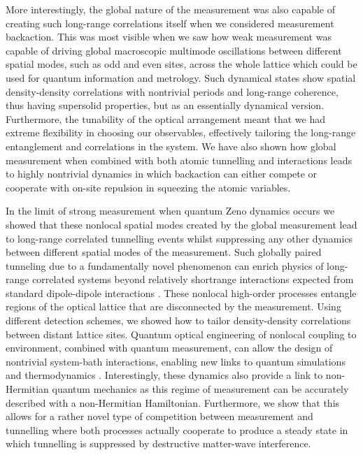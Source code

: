More interestingly, the global nature of the measurement was also
capable of creating such long-range correlations itself when we
considered measurement backaction. This was most visible when we saw
how weak measurement was capable of driving global macroscopic
multimode oscillations between different spatial modes, such as odd
and even sites, across the whole lattice which could be used for
quantum information and metrology. Such dynamical states show spatial
density-density correlations with nontrivial periods and long-range
coherence, thus having supersolid properties, but as an essentially
dynamical version. Furthermore, the tunability of the optical
arrangement meant that we had extreme flexibility in choosing our
observables, effectively tailoring the long-range entanglement and
correlations in the system. We have also shown how global measurement
when combined with both atomic tunnelling and interactions leads to
highly nontrivial dynamics in which backaction can either compete or
cooperate with on-site repulsion in squeezing the atomic variables.

In the limit of strong measurement when quantum Zeno dynamics occurs
we showed that these nonlocal spatial modes created by the global
measurement lead to long-range correlated tunnelling events whilst
suppressing any other dynamics between different spatial modes of the
measurement. Such globally paired tunneling due to a fundamentally
novel phenomenon can enrich physics of long-range correlated systems
beyond relatively shortrange interactions expected from standard
dipole-dipole interactions \cite{sowinski2012, omjyoti2015}. These
nonlocal high-order processes entangle regions of the optical lattice
that are disconnected by the measurement. Using different detection
schemes, we showed how to tailor density-density correlations between
distant lattice sites. Quantum optical engineering of nonlocal
coupling to environment, combined with quantum measurement, can allow
the design of nontrivial system-bath interactions, enabling new links
to quantum simulations \cite{stannigel2013} and thermodynamics
\cite{erez2008}. Interestingly, these dynamics also provide a link to
non-Hermitian quantum mechanics as this regime of measurement can be
accurately described with a non-Hermitian Hamiltonian. Furthermore, we
show that this allows for a rather novel type of competition between
measurement and tunnelling where both processes actually cooperate to
produce a steady state in which tunnelling is suppressed by
destructive matter-wave interference.

